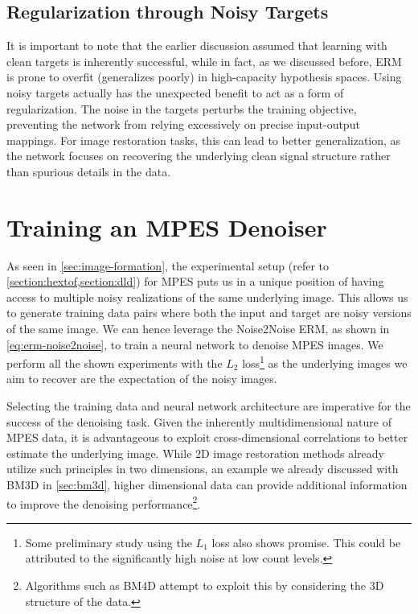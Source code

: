\subsection{Regularization through Noisy Targets}
It is important to note that the earlier discussion assumed that learning with clean targets is inherently successful, while in fact, as we discussed before, \gls{ERM} is prone to overfit (generalizes poorly) in high-capacity hypothesis spaces. Using noisy targets actually has the unexpected benefit to act as a form of regularization. The noise in the targets perturbs the training objective, preventing the network from relying excessively on precise input-output mappings. For image restoration tasks, this can lead to better generalization, as the network focuses on recovering the underlying clean signal structure rather than spurious details in the data.

\section{Training an MPES Denoiser}
As seen in \cref{sec:image-formation}, the experimental setup (refer to \cref{section:hextof,section:dld}) for \gls{MPES} puts us in a unique position of having access to multiple noisy realizations of the same underlying image. This allows us to generate training data pairs where both the input and target are noisy versions of the same image. We can hence leverage the Noise2Noise \gls{ERM}, as shown in \cref{eq:erm-noise2noise}, to train a neural network to denoise \gls{MPES} images. We perform all the shown experiments with the $L_2$ loss\footnote{Some preliminary study using the $L_1$ loss also shows promise. This could be attributed to the significantly high noise at low count levels.} as the underlying images we aim to recover are the expectation of the noisy images.

Selecting the training data and neural network architecture are imperative for the success of the denoising task. Given the inherently multidimensional nature of \gls{MPES} data, it is advantageous to exploit cross-dimensional correlations to better estimate the underlying image. While 2D image restoration methods already utilize such principles in two dimensions, an example we already discussed with \gls{BM3D} in \cref{sec:bm3d}, higher dimensional data can provide additional information to improve the denoising performance\footnote{Algorithms such as BM4D \cite{maggionimNonlocalTransformdomainFilter} attempt to exploit this by considering the 3D structure of the data.}. 

